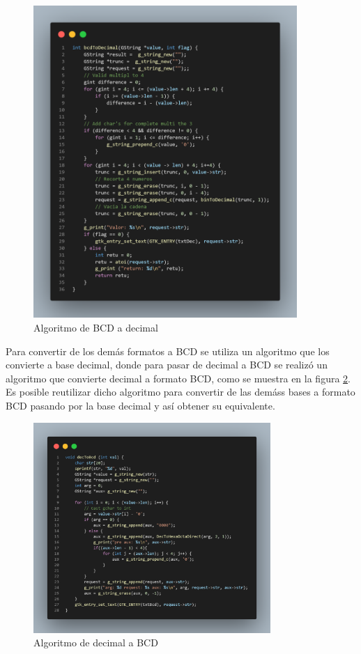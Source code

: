 \documentclass[letterpaper,12pt]{extarticle}%
\begin{document}
\begin{multicols}{2}
			\begin{figure}[H]
			\begin{center}
			\includegraphics[width=10cm]{imag//algBcdToDec.png}
			\caption{Algoritmo de BCD a decimal}
			\label{algBcdToDec}
			\end{center}
			\end{figure}

			Para convertir de los demás formatos a BCD se utiliza un algoritmo que los convierte a base decimal, donde  para 
			pasar de decimal a BCD se realizó un algoritmo que convierte decimal a formato BCD, como se muestra en la figura 
			\ref{decToBcd}. Es posible reutilizar dicho algoritmo para convertir de las demáss bases a formato BCD pasando por
			la base decimal y así obtener su equivalente. 

			\begin{figure}[H]
			\begin{center}
			\includegraphics[width=9cm]{imag//algDecToBcd.png}
			\caption{Algoritmo de decimal a BCD}
			\label{decToBcd}
			\end{center}
			\end{figure}
	

\end{multicols}
\end{document}
